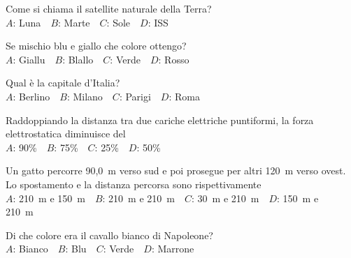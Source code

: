 \mcquestionfooter



\def\mcquestionnumber{2}


\mcquestionheader Come si chiama il satellite naturale della Terra?\\
{$A$}: Luna\ \ {$B$}: Marte\ \ {$C$}: Sole\ \ {$D$}: ISS\ \ 

\mcquestionfooter



\def\mcquestionnumber{3}


\mcquestionheader Se mischio blu e giallo che colore ottengo?\\
{$A$}: Giallu\ \ {$B$}: Blallo\ \ {$C$}: Verde\ \ {$D$}: Rosso\ \ 

\mcquestionfooter



\def\mcquestionnumber{4}


\mcquestionheader Qual è la capitale d’Italia?\\
{$A$}: Berlino\ \ {$B$}: Milano\ \ {$C$}: Parigi\ \ {$D$}: Roma\ \ 

\mcquestionfooter



\def\mcquestionnumber{5}


\mcquestionheader Raddoppiando la distanza tra due cariche elettriche puntiformi, la forza elettrostatica diminuisce del\\
{$A$}: 90\%\ \ {$B$}: 75\%\ \ {$C$}: 25\%\ \ {$D$}: 50\%\ \ 

\mcquestionfooter



\def\mcquestionnumber{6}


\mcquestionheader Un gatto percorre 90,0~m verso sud e poi prosegue per altri 120~m verso ovest. Lo spostamento e la distanza percorsa sono rispettivamente\\
{$A$}: 210~m e 150~m\ \ {$B$}: 210~m e 210~m\ \ {$C$}: 30~m e 210~m\ \ {$D$}: 150~m e 210~m\ \ 

\mcquestionfooter



\def\mcquestionnumber{7}


\mcquestionheader Di che colore era il cavallo bianco di Napoleone?\\
{$A$}: Bianco\ \ {$B$}: Blu\ \ {$C$}: Verde\ \ {$D$}: Marrone\ \ 

\mcquestionfooter



\def\mcquestionnumber{8}


